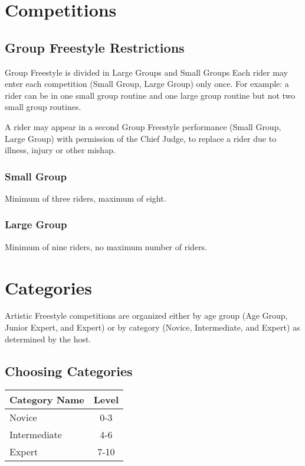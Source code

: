 \section{Competitions}

\subsection{Group Freestyle Restrictions}
Group Freestyle is divided in Large Groups and Small Groups 
Each rider may enter each competition (Small Group, Large Group) only once.
For example: a rider can be in one small group routine and one large group routine but not two small group routines.

A rider may appear in a second Group Freestyle performance (Small Group, Large Group) with permission of the Chief Judge, to replace a rider due to illness, injury or other mishap.

\subsubsection{Small Group}
Minimum of three riders, maximum of eight.

\subsubsection{Large Group}
Minimum of nine riders, no maximum number of riders.

\section{Categories}

Artistic Freestyle competitions are organized either by age group (Age Group, Junior Expert, and Expert) or by category (Novice, Intermediate, and Expert) as determined by the host.

\subsection{Choosing Categories \label{subsec:freestyle-choosing_categories}}

\begin{tabular}{|l|c|}
\hline
\textbf{Category Name} & \textbf{Level} \\
\hline
Novice & 0-3 \\
\hline
Intermediate & 4-6 \\
\hline
Expert & 7-10 \\
\hline
\end{tabular}

